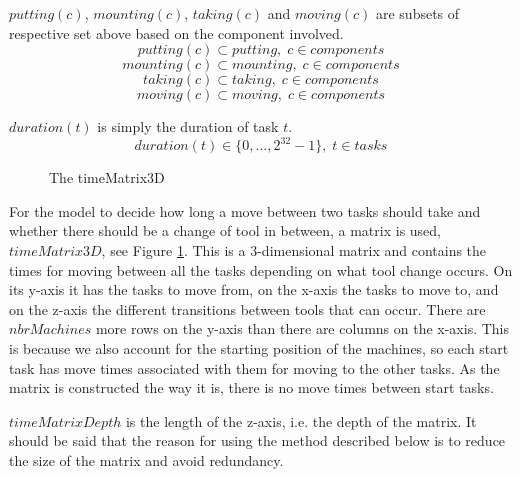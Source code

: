   \noindent $putting(c)$, $mounting(c)$, $taking(c)$ and $moving(c)$ are subsets of respective set above based on the component involved.
 \begin{equation}\label{eq:35}
 putting(c) \subset putting, \; c \in components
 \end{equation}
 \begin{equation}\label{eq:36}
 mounting(c) \subset mounting, \; c \in components
 \end{equation}
 \begin{equation}\label{eq:37}
 taking(c) \subset taking, \; c \in components
 \end{equation}
 \begin{equation}\label{eq:38}
 moving(c) \subset moving, \; c \in components
 \end{equation}

  \noindent $duration(t)$ is simply the duration of task $t$.
 \begin{equation}\label{eq:42}
 duration(t) \in \{0 , \ldots , 2^{32}-1\}, \; t \in tasks
 \end{equation}
 
   \begin{figure}
   	\centering
    	
    	\caption{The timeMatrix3D}
    	\label{fig:3d_matrix}
   \end{figure}

\noindent For the model to decide how long a move between two tasks should take and whether there should be a change of tool in between, a matrix is used, $timeMatrix3D$, see Figure \ref{fig:3d_matrix}. This is a 3-dimensional matrix and contains the times for moving between all the tasks depending on what tool change occurs. On its y-axis it has the tasks to move from, on the x-axis the tasks to move to, and on the z-axis the different transitions between tools that can occur. There are $nbrMachines$ more rows on the y-axis than there are columns on the x-axis. This is because we also account for the starting position of the machines, so each start task has move times associated with them for moving to the other tasks. As the matrix is constructed the way it is, there is no move times between start tasks. 

 $timeMatrixDepth$ is the length of the z-axis, i.e. the depth of the matrix. It should be said that the reason for using the method described below is to reduce the size of the matrix and avoid redundancy.
 
